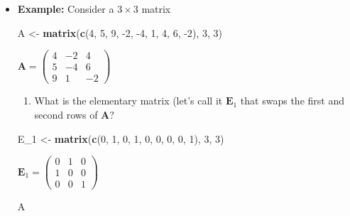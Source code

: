 \documentclass[
]{book}
\newenvironment{Shaded}{\begin{snugshade}}{\end{snugshade}}
\newcommand{\DecValTok}[1]{\textcolor[rgb]{0.00,0.00,0.81}{#1}}
\newcommand{\KeywordTok}[1]{\textcolor[rgb]{0.13,0.29,0.53}{\textbf{#1}}}
\newcommand{\NormalTok}[1]{#1}
\newcommand{\StringTok}[1]{\textcolor[rgb]{0.31,0.60,0.02}{#1}}
\providecommand{\tightlist}{%
  \setlength{\itemsep}{0pt}\setlength{\parskip}{0pt}}
\theoremstyle{definition}
\theoremstyle{definition}
\theoremstyle{definition}
\theoremstyle{remark}
\begin{document}
\begin{itemize}
\item
  \textbf{Example:} Consider a \(3 \times 3\) matrix

\begin{Shaded}
\begin{Highlighting}[]
\NormalTok{A <-}\StringTok{ }\KeywordTok{matrix}\NormalTok{(}\KeywordTok{c}\NormalTok{(}\DecValTok{4}\NormalTok{, }\DecValTok{5}\NormalTok{, }\DecValTok{9}\NormalTok{, }\DecValTok{-2}\NormalTok{, }\DecValTok{-4}\NormalTok{, }\DecValTok{1}\NormalTok{, }\DecValTok{4}\NormalTok{, }\DecValTok{6}\NormalTok{, }\DecValTok{-2}\NormalTok{), }\DecValTok{3}\NormalTok{, }\DecValTok{3}\NormalTok{)}
\end{Highlighting}
\end{Shaded}

  \(\mathbf{A} = \begin{pmatrix} 4 & -2 & 4 \\ 5 & -4 & 6 \\ 9 & 1 & -2 \end{pmatrix}\)

  \begin{enumerate}
  \def\labelenumi{\arabic{enumi})}
  \tightlist
  \item
    What is the elementary matrix (let's call it \(\mathbf{E}_1\) that swaps the first and second rows of \(\mathbf{A}\)?
  \end{enumerate}

\begin{Shaded}
\begin{Highlighting}[]
\NormalTok{E_}\DecValTok{1}\NormalTok{ <-}\StringTok{ }\KeywordTok{matrix}\NormalTok{(}\KeywordTok{c}\NormalTok{(}\DecValTok{0}\NormalTok{, }\DecValTok{1}\NormalTok{, }\DecValTok{0}\NormalTok{, }\DecValTok{1}\NormalTok{, }\DecValTok{0}\NormalTok{, }\DecValTok{0}\NormalTok{,  }\DecValTok{0}\NormalTok{, }\DecValTok{0}\NormalTok{, }\DecValTok{1}\NormalTok{), }\DecValTok{3}\NormalTok{, }\DecValTok{3}\NormalTok{)}
\end{Highlighting}
\end{Shaded}

  \(\mathbf{E}_1 = \begin{pmatrix} 0 & 1 & 0 \\ 1 & 0 & 0 \\ 0 & 0 & 1 \end{pmatrix}\)

\begin{Shaded}
\begin{Highlighting}[]
\NormalTok{A}
\end{Highlighting}
\end{Shaded}


\end{itemize}
\end{document}
